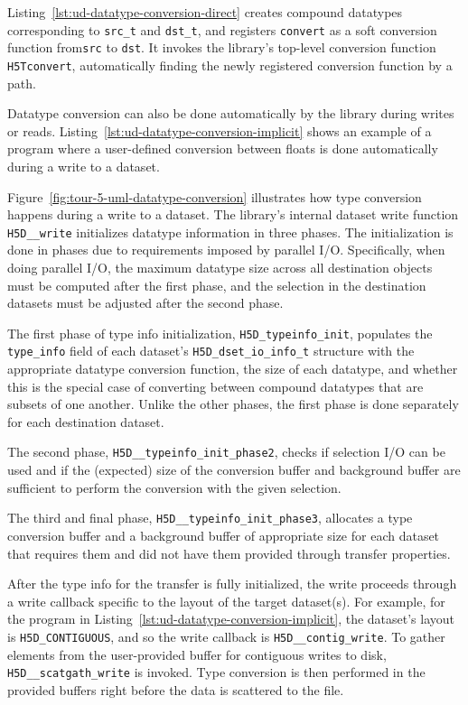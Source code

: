 Listing~\ref{lst:ud-datatype-conversion-direct} creates compound datatypes corresponding to \texttt{src\_t} and \texttt{dst\_t}, and registers \texttt{convert} as a soft conversion function from\texttt{src} to \texttt{dst}. It invokes the library's top-level conversion function \texttt{H5Tconvert}, automatically finding the newly registered conversion function by a path. 

Datatype conversion can also be done automatically by the library during writes or reads. Listing~\ref{lst:ud-datatype-conversion-implicit} shows an example of a program where a user-defined conversion between floats is done automatically during a write to a dataset. 

Figure~\ref{fig:tour-5-uml-datatype-conversion} illustrates how type conversion happens during a write to a dataset. The library's internal dataset write function \texttt{H5D\_\_write} initializes datatype information in three phases. The initialization is done in phases due to requirements imposed by parallel I/O. Specifically, when doing parallel I/O, the maximum datatype size across all destination objects must be computed after the first phase, and the selection in the destination datasets must be adjusted after the second phase. 

The first phase of type info initialization, \texttt{H5D\_typeinfo\_init}, populates the \texttt{type\_info} field of each dataset's \texttt{H5D\_dset\_io\_info\_t} structure with the appropriate datatype conversion function, the size of each datatype, and whether this is the special case of converting between compound datatypes that are subsets of one another. Unlike the other phases, the first phase is done separately for each destination dataset. 

The second phase, \texttt{H5D\_\_typeinfo\_init\_phase2}, checks if selection I/O can be used and if the (expected) size of the conversion buffer and background buffer are sufficient to perform the conversion with the given selection. 

The third and final phase, \texttt{H5D\_\_typeinfo\_init\_phase3}, allocates a type conversion buffer and a background buffer of appropriate size for each dataset that requires them and did not have them provided through transfer properties.

After the type info for the transfer is fully initialized, the write proceeds through a write callback specific to the layout of the target dataset(s). For example, for the program in Listing~\ref{lst:ud-datatype-conversion-implicit}, the dataset's layout is \texttt{H5D\_CONTIGUOUS}, and so the write callback is \texttt{H5D\_\_contig\_write}. To gather elements from the user-provided buffer for contiguous writes to disk, \texttt{H5D\_\_scatgath\_write} is invoked. Type conversion is then performed in the provided buffers right before the data is scattered to the file. 


